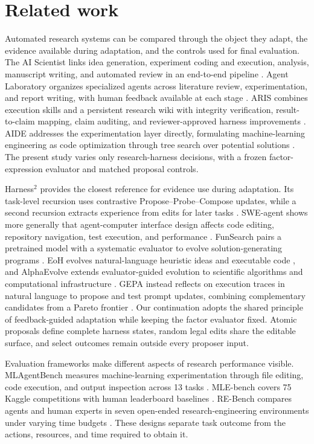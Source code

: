 \section{Related work}
\label{sec:related}

Automated research systems can be compared through the object they adapt, the evidence available during adaptation, and the controls used for final evaluation. The AI Scientist links idea generation, experiment coding and execution, analysis, manuscript writing, and automated review in an end-to-end pipeline \citep{lu2026towards}. Agent Laboratory organizes specialized agents across literature review, experimentation, and report writing, with human feedback available at each stage \citep{schmidgall2025agent}. ARIS combines execution skills and a persistent research wiki with integrity verification, result-to-claim mapping, claim auditing, and reviewer-approved harness improvements \citep{yang2026aris}. AIDE addresses the experimentation layer directly, formulating machine-learning engineering as code optimization through tree search over potential solutions \citep{jiang2025aide}. The present study varies only research-harness decisions, with a frozen factor-expression evaluator and matched proposal controls.

Harness$^2$ provides the closest reference for evidence use during adaptation. Its task-level recursion uses contrastive Propose--Probe--Compose updates, while a second recursion extracts experience from edits for later tasks \citep{xu2026harness2}. SWE-agent shows more generally that agent-computer interface design affects code editing, repository navigation, test execution, and performance \citep{yang2024sweagent}. FunSearch pairs a pretrained model with a systematic evaluator to evolve solution-generating programs \citep{romera2023mathematical}. EoH evolves natural-language heuristic ideas and executable code \citep{liu2024evolution}, and AlphaEvolve extends evaluator-guided evolution to scientific algorithms and computational infrastructure \citep{novikov2025alphaevolve}. GEPA instead reflects on execution traces in natural language to propose and test prompt updates, combining complementary candidates from a Pareto frontier \citep{agrawal2025gepa}. Our continuation adopts the shared principle of feedback-guided adaptation while keeping the factor evaluator fixed. Atomic proposals define complete harness states, random legal edits share the editable surface, and select outcomes remain outside every proposer input.

Evaluation frameworks make different aspects of research performance visible. MLAgentBench measures machine-learning experimentation through file editing, code execution, and output inspection across 13 tasks \citep{huang2023mlagentbench}. MLE-bench covers 75 Kaggle competitions with human leaderboard baselines \citep{chan2024mlebench}. RE-Bench compares agents and human experts in seven open-ended research-engineering environments under varying time budgets \citep{wijk2024rebench}. These designs separate task outcome from the actions, resources, and time required to obtain it.

